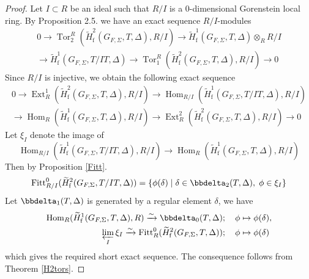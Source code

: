 \documentclass[10pt]{amsart}
\numberwithin{equation}{section}
\theoremstyle{definition}
\theoremstyle{remark} %
\newcommand{\Ext}{\operatorname{Ext}}
\newcommand{\Fitt}{\operatorname{Fitt}}
\newcommand{\Hom}{\operatorname{Hom}}
\DeclareMathOperator{\Tor}{Tor}
\begin{document}
		\begin{proof}
			Let $I \subset R$ be an ideal such that $R/I$ is a 0-dimensional Gorenstein local ring. By Proposition 2.5. we have an exact sequence $R/I$-modules
			\begin{multline*}
				0 \rightarrow \Tor_2^R(\widetilde{H}^2_{\mathrm{f}}(G_{F,\Sigma},T,\Delta), R/I) \to \widetilde{H}^1_{\mathrm{f}}(G_{F,\Sigma},T,\Delta) \otimes_R R/I \\
				\rightarrow \widetilde{H}^1_{\mathrm{f}}(G_{F,\Sigma},T/IT,\Delta) \rightarrow \Tor_1^R(\widetilde{H}^2_{\mathrm{f}}(G_{F,\Sigma},T,\Delta), R/I) \rightarrow 0
			\end{multline*}
			Since $R/I$ is injective, we obtain the following exact sequence
			\begin{multline*}
				0 \rightarrow \Ext^1_R(\widetilde{H}^2_{\mathrm{f}}(G_{F,\Sigma},T,\Delta), R/I) \rightarrow \Hom_{R/I}(\widetilde{H}^1_{\mathrm{f}}(G_{F,\Sigma},T/IT,\Delta),R/I) \\
				\rightarrow \Hom_R(\widetilde{H}^1_{\mathrm{f}}(G_{F,\Sigma},T,\Delta), R/I) \rightarrow \Ext^2_R(\widetilde{H}^2_{\mathrm{f}}(G_{F,\Sigma},T,\Delta), R/I) \rightarrow 0
			\end{multline*}
			Let $\xi_I$ denote the image of 
			$$  \Hom_{R/I}(\widetilde{H}^1_{\mathrm{f}}(G_{F,\Sigma},T/IT,\Delta),R/I) \rightarrow \Hom_R(\widetilde{H}^1_{\mathrm{f}}(G_{F,\Sigma},T,\Delta), R/I) $$
			Then by Proposition \ref{Fitt}. $$ \Fitt^0_{R/I}(\widetilde{H}^2_{\mathrm{f}}(G_{F,\Sigma},T/IT,\Delta)) = \{\phi(\delta) \mid \delta \in \bbdelta_2(T,\Delta), \; \phi \in \xi_I\} $$
			Let $\bbdelta_1(T,\Delta)$ is generated by a regular element $\delta $, we have 
			\begin{equation*}
				\begin{split}
					\Hom_R(\widetilde{H}^1_{\mathrm{f}}(G_{F,\Sigma},T,\Delta), R) \xrightarrow{\sim} \bbdelta_0(T,\Delta) &; \quad \phi \mapsto \phi(\delta), \\
					\varprojlim_I \xi_I \xrightarrow{\sim} \Fitt^0_{R}(\widetilde{H}^2_{\mathrm{f}}(G_{F,\Sigma},T,\Delta)) &; \quad \phi \mapsto \phi(\delta)
				\end{split}
			\end{equation*}
			which gives the required short exact sequence. The consequence follows from Theorem \ref{H2tors}.
		\end{proof}
\end{document}
